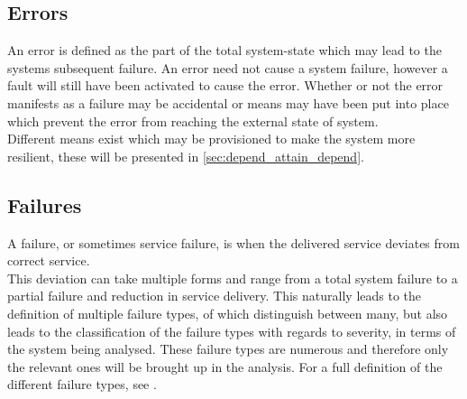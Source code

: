 \subsection{Errors}
An error is defined as the part of the total system-state which may lead to the systems subsequent failure.\autocite{rts_depend}
An error need not cause a system failure, however a fault will still have been activated to cause the error.
Whether or not the error manifests as a failure may be accidental or means may have been put into place 
which prevent the error from reaching the external state of system.\\
Different means exist which may be provisioned to make the system more resilient, these will be presented in \cref{sec:depend_attain_depend}.

\subsection{Failures}
A failure, or sometimes service failure, is when the delivered service deviates from correct service.\\
This deviation can take multiple forms and range from a total system failure to a partial failure and reduction in service delivery.
This naturally leads to the definition of multiple failure types, of which \textcite{rts_depend} distinguish between many,
but also leads to the classification of the failure types with regards to severity, in terms of the system being analysed.
These failure types are numerous and therefore only the relevant ones will be brought up in the analysis.
For a full definition of the different failure types, see \autocite[18-20]{rts_depend}.

